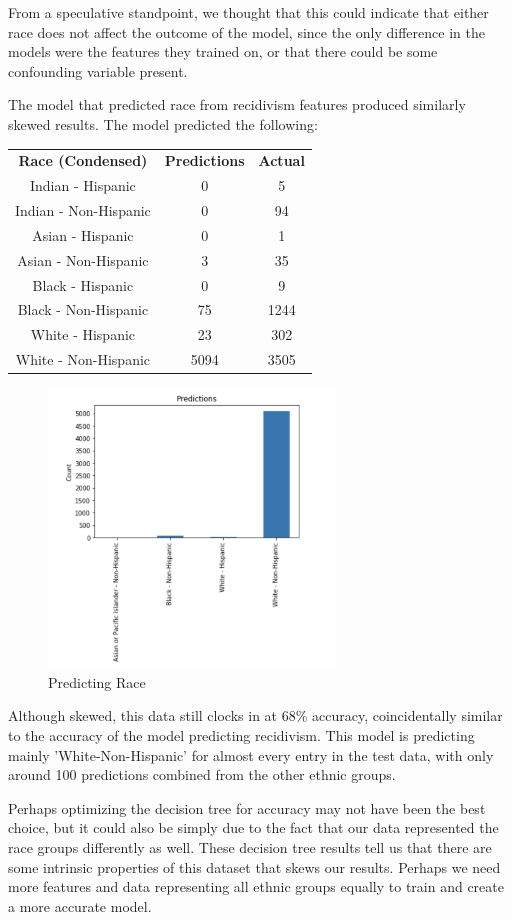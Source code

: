 \documentclass[11pt, sigconf]{acmart}
\begin{document}
From a speculative standpoint, we thought that this could indicate that either race does not affect the outcome of the model, since the only difference in the models were the features they trained on, or that there could be some confounding variable present. 

The model that predicted race from recidivism features produced similarly skewed results. The model predicted the following:

\begin{tabular}{|c|c|c|}
\textbf{Race (Condensed)} & \textbf{Predictions} & \textbf{Actual} \\
 Indian  - Hispanic& 0 & 5 \\
Indian - Non-Hispanic& 0 & 94 \\
 Asian - Hispanic& 0 & 1\\
 Asian  - Non-Hispanic& 3 & 35\\
 Black - Hispanic&0 & 9 \\
 Black - Non-Hispanic& 75 &1244\\ 
 White - Hispanic& 23& 302 \\
 White - Non-Hispanic &5094&3505\\
\end{tabular}

\begin{figure}[h] 	
\centering
\includegraphics[width=3in]{4.png}
\caption{Predicting Race}
\end{figure}

Although skewed, this data still clocks in at 68\% accuracy, coincidentally similar to the accuracy of the model predicting recidivism. 
This model is predicting mainly 'White-Non-Hispanic' for almost every entry in the test data, with only around 100 predictions combined from the other ethnic groups. 

Perhaps optimizing the decision tree for accuracy may not have been the best choice, but it could also be simply due to the fact that our data represented the race groups differently as well. These decision tree results tell us that there are some intrinsic properties of this dataset that skews our results. Perhaps we need more features and data representing all ethnic groups equally to train and create a more accurate model. 
\end{document}
